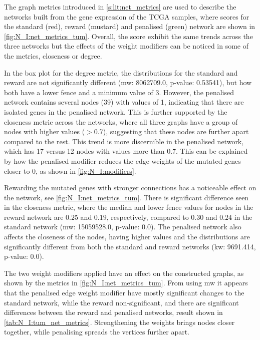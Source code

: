 The graph metrics introduced in \cref{s:lit:net_metrics} are used to describe the networks built from the gene expression of the TCGA samples, where scores for the standard (red), reward (mustard) and penalised (green) network are shown in \cref{fig:N_I:net_metrics_tum}. Overall, the score exhibit the same trends across the three networks but the effects of the weight modifiers can be noticed in some of the metrics, closeness or degree.

In the box plot for the degree metric, the distributions for the standard and reward are not significantly different (\acrshort{mw}: 8062709.0, p-value: 0.53541), but how both have a lower fence and a minimum value of 3. However, the penalised network contains several nodes (39) with values of 1, indicating that there are isolated genes in the penalised network. This is further supported by the closeness metric across the networks, where all three graphs have a group of nodes with higher values ($>$0.7), suggesting that these nodes are further apart compared to the rest. This trend is more discernible in the penalised network, which has 17 versus 12 nodes with values more than 0.7. This can be explained by how the penalised modifier reduces the edge weights of the mutated genes closer to 0, as shown in \cref{fig:N_I:modifiers}.

Rewarding the mutated genes with stronger connections has a noticeable effect on the network, see \cref{fig:N_I:net_metrics_tum}. There is significant difference seen in the closeness metric, where the median and lower fence values for nodes in the reward network are $0.25$ and $0.19$, respectively, compared to $0.30$ and $0.24$ in the standard network (\acrshort{mw}: 15059528.0, p-value: 0.0). The penalised network also affects the closeness of the nodes, having higher values and the distributions are significantly different from both the standard and reward networks (\acrshort{kw}: 9691.414, p-value: 0.0). 

The two weight modifiers applied have an effect on the constructed graphs, as shown by the metrics in \cref{fig:N_I:net_metrics_tum}. From using \acrlong{mw} it appears that the penalised edge weight modifier have mostly significant changes to the standard network, while the reward non-significant, and there are significant differences between the reward and penalised networks, result shown in \cref{tab:N_I:tum_net_metrics}. Strengthening the weights brings nodes closer together, while penalising spreads the vertices further apart. 

